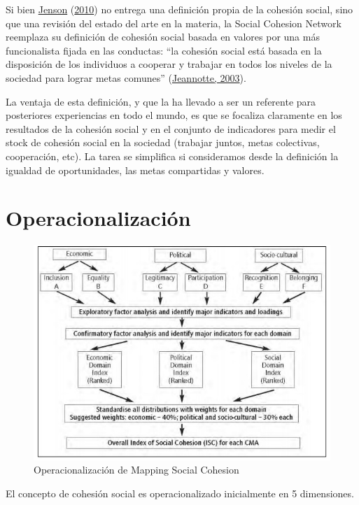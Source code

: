 \documentclass[
  12pt,
]{book}
\begin{document}
Si bien \protect\hyperlink{ref-jenson2010defining}{Jenson} (\protect\hyperlink{ref-jenson2010defining}{2010}) no entrega una definición propia de la cohesión social, sino que una revisión del estado del arte en la materia, la Social Cohesion Network reemplaza su definición de cohesión social basada en valores por una más funcionalista fijada en las conductas: ``la cohesión social está basada en la disposición de los individuos a cooperar y trabajar en todos los niveles de la sociedad para lograr metas comunes'' (\protect\hyperlink{ref-Jeannote2003}{Jeannotte, 2003}).

La ventaja de esta definición, y que la ha llevado a ser un referente para posteriores experiencias en todo el mundo, es que se focaliza claramente en los resultados de la cohesión social y en el conjunto de indicadores para medir el stock de cohesión social en la sociedad (trabajar juntos, metas colectivas, cooperación, etc). La tarea se simplifica si consideramos desde la definición la igualdad de oportunidades, las metas compartidas y valores.

\newpage

\hypertarget{operacionalizaciuxf3n}{%
\section{Operacionalización}\label{operacionalizaciuxf3n}}

\begin{figure}[H]

{\centering \includegraphics[width=0.75\linewidth]{inputs/images/mapping} 

}

\caption{Operacionalización de Mapping Social Cohesion}\label{fig:mapping}
\end{figure}

El concepto de cohesión social es operacionalizado inicialmente en 5 dimensiones.
\end{document}
